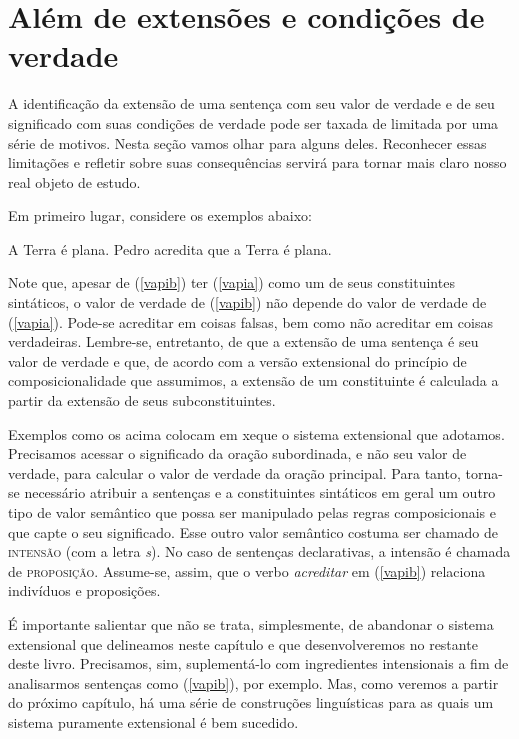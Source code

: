 \section{Além de extensões e condi\-çõ\-es de verdade}

A identifica\-ção da extensão de uma sentença com seu valor de verdade e de seu significado com suas
condi\-çõ\-es de verdade pode ser taxada de limitada por uma série
de motivos. Nesta se\-ção vamos olhar para alguns deles. Reconhecer
essas limita\-çõ\-es e refletir sobre suas consequências servirá
para tornar
mais claro nosso real objeto de estudo.

Em primeiro lugar, considere os exemplos abaixo:

\begin{exe}
	\ex\label{vapi}
	\begin{xlist}
		\ex  A Terra é plana.\label{vapia}
		\ex  Pedro acredita que a Terra é plana.\label{vapib}
	\end{xlist}
\end{exe}

\n Note que, apesar de (\ref{vapib}) ter (\ref{vapia}) como um de seus constituintes sintáticos, o valor de verdade de (\ref{vapib}) não depende do valor de verdade de (\ref{vapia}).  Pode-se acreditar em coisas falsas, bem como não acreditar em coisas verdadeiras. Lembre-se, entretanto, de que a extensão de uma sentença é seu valor de verdade e que, de acordo com a versão extensional do princípio de composicionalidade que assumimos, a extensão de um constituinte é calculada a partir da extensão de seus subconstituintes. 

Exemplos como os acima colocam em xeque o sistema extensional que adotamos. Precisamos acessar o significado da oração subordinada, e não seu valor de verdade, para calcular o valor de verdade da oração principal. Para tanto, torna-se necessário atribuir a sentenças e a constituintes sintáticos em geral um outro tipo de valor semântico que possa ser manipulado pelas regras composicionais e que capte o seu significado. Esse outro valor semântico costuma ser chamado de \textsc{intensão} (com a letra \textit{s}). No caso de sentenças declarativas, a intensão é chamada de \textsc{proposição}. Assume-se, assim, que o verbo  \textit{acreditar} em (\ref{vapib}) relaciona indivíduos e proposições. 

É importante salientar que não se trata, simplesmente, de abandonar o sistema extensional que delineamos neste capítulo e que desenvolveremos no restante deste livro. Precisamos, sim, suplementá-lo com ingredientes intensionais a fim de analisarmos sentenças como (\ref{vapib}), por exemplo. Mas, como veremos a partir do próximo capítulo, há uma série de construções linguísticas para as quais um sistema puramente extensional é bem sucedido. 


